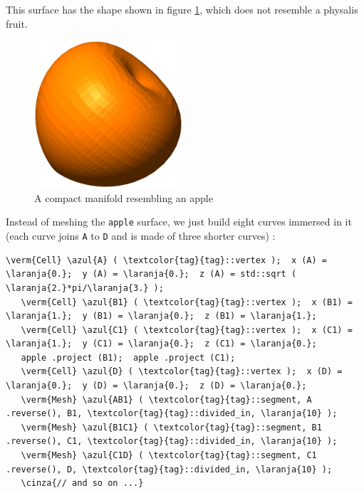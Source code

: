 This surface has the shape shown in figure \ref{\numb section 2.\numb fig 12},
which does not resemble a physalis fruit.

\begin{figure}[ht] \centering
  \includegraphics[width=55mm]{fisalis-manif}
  \caption{A compact manifold resembling an apple}
  \label{\numb section 2.\numb fig 12}
\end{figure}

Instead of meshing the {\small\tt apple} surface, we just build eight curves immersed in it
(each curve joins {\small\tt A} to {\small\tt D} and is made of three shorter curves) :

\begin{Verbatim}[commandchars=\\\{\},formatcom=\small\tt,frame=single,
   label=parag-\ref{\numb section 2.\numb parag 11}.cpp,rulecolor=\color{coment},
   baselinestretch=0.94,framesep=2mm]
   \verm{Cell} \azul{A} ( \textcolor{tag}{tag}::vertex );  x (A) = \laranja{0.};  y (A) = \laranja{0.};  z (A) = std::sqrt ( \laranja{2.}*pi/\laranja{3.} );
   \verm{Cell} \azul{B1} ( \textcolor{tag}{tag}::vertex );  x (B1) = \laranja{1.};  y (B1) = \laranja{0.};  z (B1) = \laranja{1.};
   \verm{Cell} \azul{C1} ( \textcolor{tag}{tag}::vertex );  x (C1) = \laranja{1.};  y (C1) = \laranja{0.};  z (C1) = \laranja{0.};
   apple .project (B1);  apple .project (C1);
   \verm{Cell} \azul{D} ( \textcolor{tag}{tag}::vertex );  x (D) = \laranja{0.};  y (D) = \laranja{0.};  z (D) = \laranja{0.};
   \verm{Mesh} \azul{AB1} ( \textcolor{tag}{tag}::segment, A .reverse(), B1, \textcolor{tag}{tag}::divided_in, \laranja{10} );
   \verm{Mesh} \azul{B1C1} ( \textcolor{tag}{tag}::segment, B1 .reverse(), C1, \textcolor{tag}{tag}::divided_in, \laranja{10} );
   \verm{Mesh} \azul{C1D} ( \textcolor{tag}{tag}::segment, C1 .reverse(), D, \textcolor{tag}{tag}::divided_in, \laranja{10} );
   \cinza{// and so on ...}
\end{Verbatim}

